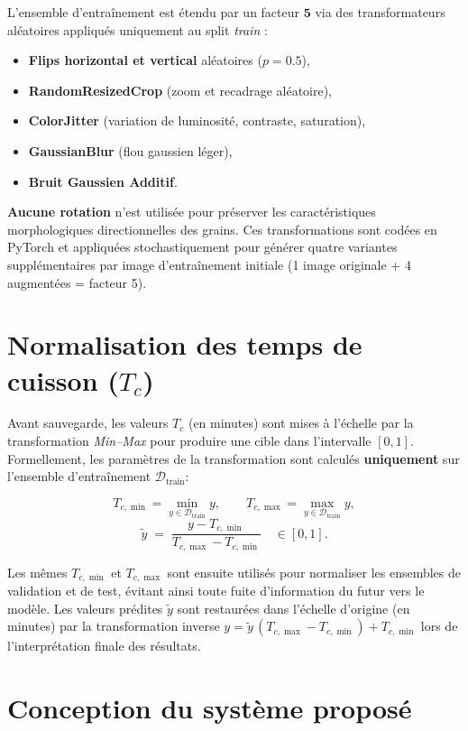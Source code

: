 L'ensemble d'entraînement est étendu par un facteur $\mathbf{5}$ via des transformateurs aléatoires appliqués uniquement au split \emph{train} :
\begin{itemize}
	\item \textbf{Flips horizontal et vertical} aléatoires ($p=0.5$),
	\item \textbf{RandomResizedCrop} (zoom et recadrage aléatoire),
	\item \textbf{ColorJitter} (variation de luminosité, contraste, saturation),
	\item \textbf{GaussianBlur} (flou gaussien léger),
	\item \textbf{Bruit Gaussien Additif}.
\end{itemize}
\textbf{Aucune rotation} n'est utilisée pour préserver les caractéristiques morphologiques directionnelles des grains. Ces transformations sont codées en PyTorch et appliquées stochastiquement pour générer quatre variantes supplémentaires par image d'entraînement initiale (1 image originale + 4 augmentées = facteur 5).

\section{\texorpdfstring{Normalisation des temps de cuisson ($T_c$)}{Normalisation des temps de cuisson (Tc)}}


Avant sauvegarde, les valeurs $T_c$ (en minutes) sont mises à l'échelle par la transformation \emph{Min–Max} pour produire une cible dans l'intervalle $[0,1]$. Formellement, les paramètres de la transformation sont calculés \textbf{uniquement} sur l'ensemble d'entraînement $\mathcal{D}_{\text{train}}$:

\[
	T_{c,\min} = \min_{y\in \mathcal{D}_{\text{train}}} y, \qquad
	T_{c,\max} = \max_{y\in \mathcal{D}_{\text{train}}} y,
\]
\[
	\tilde{y} \;=\; \frac{y - T_{c,\min}}{T_{c,\max} - T_{c,\min}} \quad\in[0,1].
\]

Les mêmes $T_{c,\min}$ et $T_{c,\max}$ sont ensuite utilisés pour normaliser les ensembles de validation et de test, évitant ainsi toute fuite d'information du futur vers le modèle. Les valeurs prédites $\tilde{y}$ sont restaurées dans l'échelle d'origine (en minutes) par la transformation inverse $y = \tilde{y}\,(T_{c,\max}-T_{c,\min}) + T_{c,\min}$ lors de l'interprétation finale des résultats.

\section{Conception du système proposé}

